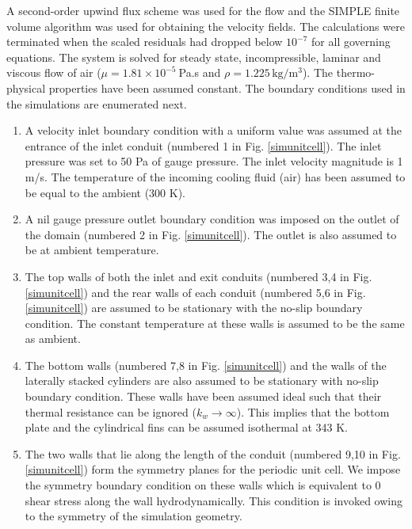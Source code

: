 \documentclass[twocolumn,10pt,cleanfoot]{ihmtc}
\begin{document}
%
A second-order upwind flux scheme was used for the flow and the SIMPLE finite volume algorithm was used for obtaining the velocity fields. The calculations were terminated when the scaled residuals had dropped below ${{10}^{-7}}$ for all governing equations. The system is solved for steady state, incompressible, laminar and viscous flow of air ($\mu =1.81\times {{10}^{-5}}~$Pa.s and $\rho =1.225\,\text{kg/}{{\text{m}}^{3}}$). The thermo-physical properties have been assumed constant. 
%
The boundary conditions used in the simulations are enumerated next.
\begin{enumerate}     
\item {A velocity inlet boundary condition with a uniform value was assumed at the entrance of the inlet conduit (numbered 1 in Fig. \ref{simunitcell}). The inlet pressure was set to 50 Pa of gauge pressure. The inlet velocity magnitude is 1 m/s. The temperature of the incoming cooling fluid (air) has been assumed to be equal to the ambient (300 K).}
%         
\item{A nil gauge pressure outlet boundary condition was imposed on the outlet of the domain (numbered 2  in Fig. \ref{simunitcell}). The outlet is also assumed to be at ambient temperature.}
%         
\item{The top walls of both the inlet and exit conduits (numbered 3,4 in Fig. \ref{simunitcell}) and the rear walls of each conduit (numbered 5,6 in Fig. \ref{simunitcell}) are assumed to be stationary with the no-slip boundary condition. The constant temperature at these walls is assumed to be the same as ambient.}
%
\item{The bottom walls (numbered 7,8 in Fig. \ref{simunitcell}) and the walls of the laterally stacked cylinders are also assumed to be stationary with no-slip boundary condition. These walls have been assumed ideal such that their thermal resistance can be ignored ($k_w \rightarrow \infty$). This implies that the bottom plate and the cylindrical fins can be assumed isothermal at 343 K.}
%       
\item{The two walls that lie along the length of the conduit (numbered 9,10 in Fig. \ref{simunitcell}) form the symmetry planes for the periodic unit cell. We impose the symmetry boundary condition on these walls which is equivalent to 0 shear stress along the wall hydrodynamically. This condition is invoked owing to the symmetry of the simulation geometry.}      
\end{enumerate}
%
\end{document}
